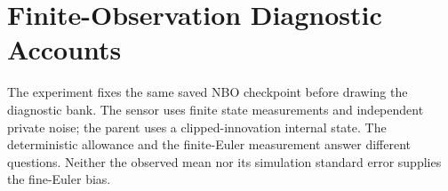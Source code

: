 \section{Finite-Observation Diagnostic Accounts}\label{app:r14sensingdiagnostics}
The experiment fixes the same saved NBO checkpoint before drawing the diagnostic bank. The sensor uses finite state measurements and independent private noise; the parent uses a clipped-innovation internal state. The deterministic allowance and the finite-Euler measurement answer different questions. Neither the observed mean nor its simulation standard error supplies the fine-Euler bias.

